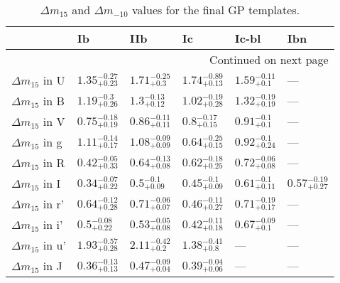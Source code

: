 \begin{longtable}{llllll}
  \caption{${\Delta m}_{15}$ and ${\Delta m}_{-10}$ values for the final GP templates.}\label{tab:del_m}\\

\toprule
{} &                      Ib &                     IIb &                      Ic &                   Ic-bl&                     Ibn \\
\midrule
\endhead
\midrule
\multicolumn{12}{r}{{Continued on next page}} \\
\midrule
\endfoot

\bottomrule
\endlastfoot


${\Delta m}_{15}$ in U   &  $1.35^{-0.27}_{+0.23}$ &   $1.71^{-0.25}_{+0.3}$ &  $1.74^{-0.89}_{+0.13}$ &   $1.59^{-0.11}_{+0.1}$ &                     --- \\
${\Delta m}_{15}$ in B   &   $1.19^{-0.3}_{+0.26}$ &   $1.3^{-0.13}_{+0.12}$ &  $1.02^{-0.19}_{+0.28}$ &  $1.32^{-0.19}_{+0.19}$ &                     --- \\
${\Delta m}_{15}$ in V   &  $0.75^{-0.18}_{+0.19}$ &  $0.86^{-0.11}_{+0.11}$ &   $0.8^{-0.17}_{+0.15}$ &    $0.91^{-0.1}_{+0.1}$ &                     --- \\
${\Delta m}_{15}$ in g   &  $1.11^{-0.14}_{+0.17}$ &  $1.08^{-0.09}_{+0.09}$ &  $0.64^{-0.25}_{+0.15}$ &   $0.92^{-0.1}_{+0.24}$ &                     --- \\
${\Delta m}_{15}$ in R   &  $0.42^{-0.05}_{+0.33}$ &  $0.64^{-0.13}_{+0.08}$ &  $0.62^{-0.18}_{+0.25}$ &  $0.72^{-0.06}_{+0.08}$ &                     --- \\
${\Delta m}_{15}$ in I   &  $0.34^{-0.07}_{+0.22}$ &    $0.5^{-0.1}_{+0.09}$ &   $0.45^{-0.1}_{+0.09}$ &   $0.61^{-0.1}_{+0.11}$ &  $0.57^{-0.19}_{+0.27}$ \\
${\Delta m}_{15}$ in r'  &  $0.64^{-0.12}_{+0.28}$ &  $0.71^{-0.06}_{+0.07}$ &  $0.46^{-0.11}_{+0.27}$ &  $0.71^{-0.19}_{+0.17}$ &                     --- \\
${\Delta m}_{15}$ in i'  &   $0.5^{-0.08}_{+0.22}$ &  $0.53^{-0.05}_{+0.08}$ &  $0.42^{-0.11}_{+0.18}$ &   $0.67^{-0.09}_{+0.1}$ &                     --- \\
${\Delta m}_{15}$ in u'  &  $1.93^{-0.57}_{+0.28}$ &   $2.11^{-0.42}_{+0.2}$ &   $1.38^{-0.41}_{+0.8}$ &                     --- &                     --- \\
${\Delta m}_{15}$ in J   &  $0.36^{-0.13}_{+0.13}$ &  $0.47^{-0.09}_{+0.04}$ &  $0.39^{-0.04}_{+0.06}$ &                     --- &                     --- \\

\end{longtable}
